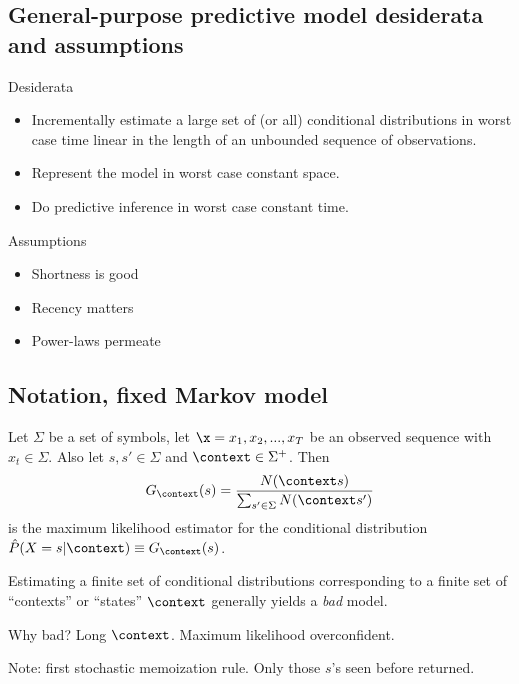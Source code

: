 \documentclass[16pt]{beamer}
\begin{document}
\subsection{General-purpose predictive model desiderata and assumptions}
\begin{frame}[t]{}
Desiderata
\begin{itemize}
\item Incrementally estimate a large set of (or all) conditional distributions in worst case time linear in the length of an unbounded sequence of observations.
\item Represent the model in worst case constant space.
\item Do predictive inference in worst case constant time.
\end{itemize}
Assumptions
\begin{itemize}
\item Shortness is good
\item Recency matters
\item Power-laws permeate
\end{itemize}
\end{frame}	

\subsection{Notation, fixed Markov model}
\begin{frame}[t]{}
Let $\Sigma$ be a set of symbols, let $\x = x_1, x_2, ..., x_T$ be an observed sequence with $x_t \in \Sigma$.  Also let $s,s' \in \Sigma$ and $\context \in \Sigma^+$.  Then
\begin{align*}
G_\context(s)=\frac{N(\context s)}{\sum_{s'\in\Sigma}N(\context s')}\label{eqn:mll}
\end{align*}
is the maximum likelihood estimator for the conditional distribution ${\hat P}(X=s|\context) \equiv G_\context(s)$.
\vspace{.5cm}

Estimating a finite set of conditional distributions corresponding to a finite set of ``contexts'' or ``states'' $\context$ generally yields a {\em bad} model.

\vspace{.5cm}
Why bad?  Long $\context$.  Maximum likelihood overconfident.

\vspace{.5cm}
Note: first stochastic memoization rule.  Only those $s$'s seen before returned.

\end{frame}	
\end{document}

